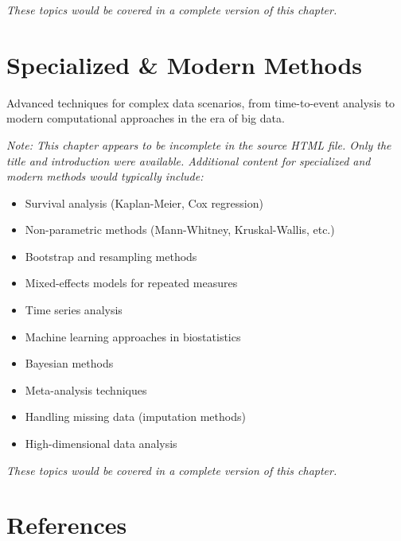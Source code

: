 \documentclass[
  11pt,
  letterpaper,
  oneside]{book}
\providecommand{\tightlist}{%
  \setlength{\itemsep}{0pt}\setlength{\parskip}{0pt}}\usepackage{longtable,booktabs,array}
\newlength{\cslhangindent}
\newenvironment{CSLReferences}[2] %
 {\begin{list}{}{%
  \setlength{\itemindent}{0pt}
  \setlength{\leftmargin}{0pt}
  \setlength{\parsep}{0pt}
  \ifodd #1
   \setlength{\leftmargin}{\cslhangindent}
   \setlength{\itemindent}{-1\cslhangindent}
  \fi
  \setlength{\itemsep}{#2\baselineskip}}}
 {\end{list}}
\begin{document}
\emph{These topics would be covered in a complete version of this
chapter.}


\chapter{Specialized \& Modern
Methods}\label{specialized-modern-methods}

Advanced techniques for complex data scenarios, from time-to-event
analysis to modern computational approaches in the era of big data.

\emph{Note: This chapter appears to be incomplete in the source HTML
file. Only the title and introduction were available. Additional content
for specialized and modern methods would typically include:}

\begin{itemize}
\tightlist
\item
  Survival analysis (Kaplan-Meier, Cox regression)
\item
  Non-parametric methods (Mann-Whitney, Kruskal-Wallis, etc.)
\item
  Bootstrap and resampling methods
\item
  Mixed-effects models for repeated measures
\item
  Time series analysis
\item
  Machine learning approaches in biostatistics
\item
  Bayesian methods
\item
  Meta-analysis techniques
\item
  Handling missing data (imputation methods)
\item
  High-dimensional data analysis
\end{itemize}

\emph{These topics would be covered in a complete version of this
chapter.}


\chapter*{References}\label{references}


\label{refs}
\begin{CSLReferences}{0}{1}
\end{CSLReferences}
\end{document}
